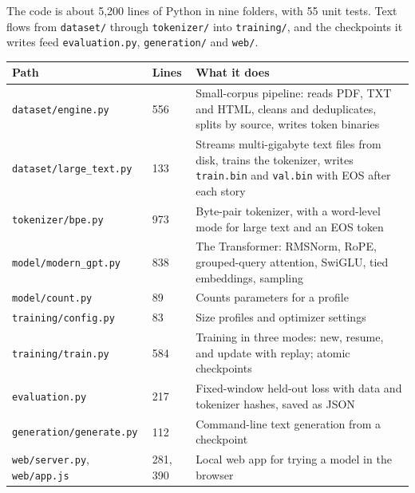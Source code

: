 \documentclass[11pt,a4paper]{article}
\newcommand{\code}[1]{\texttt{#1}}
\begin{document}
The code is about 5,200 lines of Python in nine folders, with 55 unit tests. Text flows from \code{dataset/\allowbreak{}} through \code{tokenizer/\allowbreak{}} into \code{training/\allowbreak{}}, and the checkpoints it writes feed \code{evaluation.\allowbreak{}py}, \code{generation/\allowbreak{}} and \code{web/\allowbreak{}}.

{\small
\begin{longtable}{@{}>{\raggedright\arraybackslash\hspace{0pt}}p{}>{\raggedright\arraybackslash\hspace{0pt}}p{}>{\raggedright\arraybackslash\hspace{0pt}}p{}@{}}
\toprule
\textbf{Path} & \textbf{Lines} & \textbf{What it does} \\
\midrule
\endhead
\code{dataset/\allowbreak{}engine.\allowbreak{}py} & 556 & Small-corpus pipeline: reads PDF, TXT and HTML, cleans and deduplicates, splits by source, writes token binaries \\
\code{dataset/\allowbreak{}large\_\allowbreak{}text.\allowbreak{}py} & 133 & Streams multi-gigabyte text files from disk, trains the tokenizer, writes \code{train.\allowbreak{}bin} and \code{val.\allowbreak{}bin} with EOS after each story \\
\code{tokenizer/\allowbreak{}bpe.\allowbreak{}py} & 973 & Byte-pair tokenizer, with a word-level mode for large text and an EOS token \\
\code{model/\allowbreak{}modern\_\allowbreak{}gpt.\allowbreak{}py} & 838 & The Transformer: RMSNorm, RoPE, grouped-query attention, SwiGLU, tied embeddings, sampling \\
\code{model/\allowbreak{}count.\allowbreak{}py} & 89 & Counts parameters for a profile \\
\code{training/\allowbreak{}config.\allowbreak{}py} & 83 & Size profiles and optimizer settings \\
\code{training/\allowbreak{}train.\allowbreak{}py} & 584 & Training in three modes: new, resume, and update with replay; atomic checkpoints \\
\code{evaluation.\allowbreak{}py} & 217 & Fixed-window held-out loss with data and tokenizer hashes, saved as JSON \\
\code{generation/\allowbreak{}generate.\allowbreak{}py} & 112 & Command-line text generation from a checkpoint \\
\code{web/\allowbreak{}server.\allowbreak{}py}, \code{web/\allowbreak{}app.\allowbreak{}js} & 281, 390 & Local web app for trying a model in the browser \\

\end{longtable}}
\end{document}
